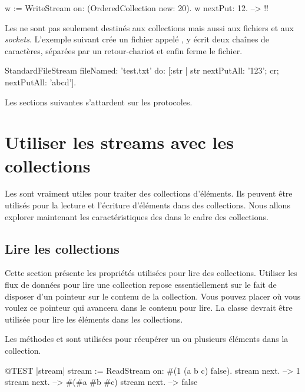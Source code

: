 \documentclass[a4paper,10pt,twoside]{book}
\begin{document}
\begin{code}{}
w := WriteStream on: (OrderedCollection new: 20).
w nextPut: 12. -->  !!
\end{code}

Les \streams ne sont pas seulement destinés aux collections mais
aussi aux fichiers et aux \emph{sockets}.
L'exemple suivant crée un fichier appelé , 
y écrit deux chaînes de caractères, séparées par un retour-chariot et enfin ferme le fichier.

\begin{code}{}
StandardFileStream
  fileNamed: 'test.txt'
  do: [:str | str
                nextPutAll: '123';
                cr;
                nextPutAll: 'abcd'].
\end{code}

Les sections suivantes s'attardent sur les protocoles.

\section{Utiliser les streams avec les collections}

Les \streams sont vraiment utiles pour traiter des collections d'éléments.
Ils peuvent être utilisés pour la lecture et l'écriture d'éléments
dans des collections. Nous allons explorer maintenant les caractéristiques
des \streams dans le cadre des collections.

\subsection{Lire les collections}

Cette section présente les propriétés utilisées pour lire des collections. 
Utiliser les flux de données pour lire une collection repose essentiellement 
sur le fait de disposer d'un pointeur sur le contenu de la collection.
Vous pouvez placer où vous voulez ce pointeur qui avancera dans le contenu pour lire.
La classe  devrait être utilisée pour lire les éléments dans 
les collections.

Les méthodes  et  
sont utilisées pour récupérer un ou plusieurs éléments dans la collection.

\begin{code}{@TEST |stream|}
stream := ReadStream on: #(1 (a b c) false).
stream next. -->   1
stream next. -->   #(#a #b #c)
stream next. -->   false
\end{code}
\end{document}
